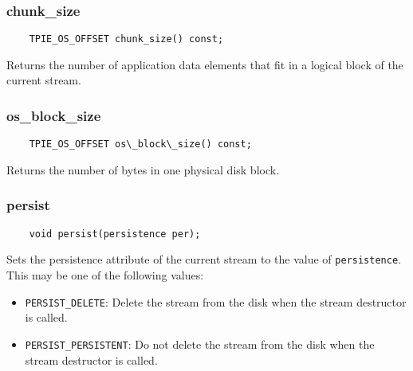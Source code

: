 \vspace*{\baselineskip}
\subsubsection{chunk\_size}

\begin{lstlisting}
    TPIE_OS_OFFSET chunk_size() const;
\end{lstlisting}

\noindent
Returns the number of application data elements that fit in
a logical block of the current stream.

\vspace*{\baselineskip}
\subsubsection{os\_block\_size}

\begin{lstlisting}
    TPIE_OS_OFFSET os\_block\_size() const;
\end{lstlisting}

\noindent
Returns the number of bytes in one physical disk block.

\vspace*{\baselineskip}
\subsubsection{persist}

\begin{lstlisting}
    void persist(persistence per);
\end{lstlisting}

\noindent
Sets the persistence attribute of the current stream to the value of
\lstinline|persistence|. This may be one of the following values:
\begin{itemize}
\item \lstinline|PERSIST_DELETE|: Delete the stream from the disk when
  the stream destructor is called.
\item \lstinline|PERSIST_PERSISTENT|: Do not delete the stream from the disk when
  the stream destructor is called.
\end{itemize}

